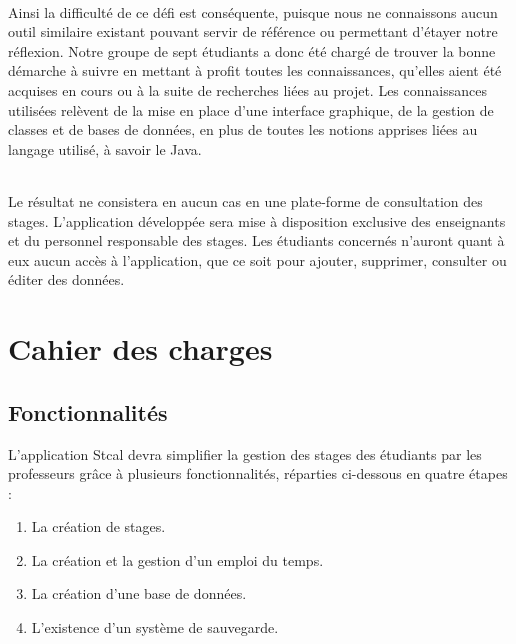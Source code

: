 \documentclass[a4paper,10pt]{report}
\begin{document}
  \paragraph{}
    Ainsi la difficulté de ce défi est conséquente, puisque nous ne connaissons aucun outil similaire existant pouvant servir de référence ou permettant d'étayer notre réflexion.
    Notre groupe de sept étudiants a donc été chargé de trouver la bonne démarche à suivre en mettant à profit toutes les connaissances, qu'elles aient été acquises en cours ou à la suite de recherches liées au projet.
    Les connaissances utilisées relèvent de la mise en place d'une interface graphique, de la gestion de classes et de bases de données, en plus de toutes les notions apprises liées au langage utilisé, à savoir le Java.
  
  \paragraph{}
    Le résultat ne consistera en aucun cas en une plate-forme de consultation des stages.
    L'application développée sera mise à disposition exclusive des enseignants et du personnel responsable des stages. 
    Les étudiants concernés n'auront quant à eux aucun accès à l'application, que ce soit pour ajouter, supprimer, consulter ou éditer des données.
    
    
    
\part{Cahier des charges}
  
  \chapter{Fonctionnalités}

    L'application Stcal devra simplifier la gestion des stages des étudiants par les professeurs grâce à plusieurs fonctionnalités, réparties ci-dessous en quatre étapes  :

    \begin{enumerate}
      \item La création de stages.
      \item La création et la gestion d’un emploi du temps.
      \item La création d'une base de données. 
      \item L'existence d'un système de sauvegarde.
    \end{enumerate}
  
\end{document}

